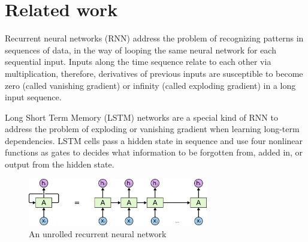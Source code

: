 \documentclass{article}
\begin{document}




\section{Related work}

Recurrent neural networks (RNN) address the problem of recognizing patterns in sequences of data, in the way of looping the same neural network for each sequential input. Inputs along the time sequence relate to each other via multiplication, therefore, derivatives of previous inputs are susceptible to become zero (called vanishing gradient) or infinity (called exploding gradient) in a long input sequence. 

Long Short Term Memory (LSTM)\cite{hochreiter1997long} networks are a special kind of RNN to address the problem of exploding or vanishing gradient when learning long-term dependencies. LSTM cells pass a hidden state in sequence and use four nonlinear functions as gates to decides what information to be forgotten from, added in, or output from the hidden state.

\begin{figure}[h]
\centering
\includegraphics[width=0.7\textwidth]{rnn}
\caption{An unrolled recurrent neural network\cite{understandLSTM}}
\end{figure}
\end{document}
